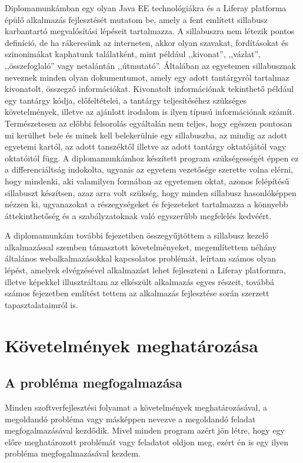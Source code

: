 \documentclass[hidelinks, 12pt, a4paper]{report}
\begin{document}
Diplomamunkámban egy olyan Java EE technológiákra \cite{java-se-platformon, java-ee-platformon} és a Liferay platforma épülő alkalmazás fejlesztését mutatom be, amely a fent említett sillabusz karbantartó megvalósítási lépéseit tartalmazza. A sillabuszra \cite{sillabusz} nem létezik pontos definíció, de ha rákeresünk az interneten, akkor olyan szavakat, fordításokat és szinonimákat kaphatunk találatként, mint például ,,kivonat'', ,,vázlat'', ,,összefoglaló'' vagy netalántán ,,útmutató''. Általában az egyetemen sillabusznak neveznek minden olyan dokumentumot, amely egy adott tantárgyról tartalmaz kivonatolt, összegző információkat. Kivonatolt információnak tekinthető például egy tantárgy kódja, előfeltételei, a tantárgy teljesítéséhez szükséges követelmények, illetve az ajánlott irodalom is ilyen típusú információnak számít. Természetesen az előbbi felsorolás egyáltalán nem teljes, hogy egészen pontosan mi kerülhet bele és minek kell belekerülnie egy sillabuszba, az mindig az adott egyetemi kartól, az adott tanszéktől illetve az adott tantárgy oktatójától vagy oktatóitól függ. A diplomamunkámhoz készített program szükségességét éppen ez a differenciáltság indokolta, ugyanis az egyetem vezetősége szerette volna elérni, hogy mindenki, aki valamilyen formában az egyetemen oktat, azonos felépítésű sillabuszt készítsen, azaz arra volt szükség, hogy minden sillabusz hasonlóképpen nézzen ki, ugyanazokat a részegységeket és fejezeteket tartalmazza a könnyebb áttekinthetőség és a szabályzatoknak való egyszerűbb megfelelés kedvéért.

A diplomamunkám további fejezetiben összegyűjtöttem a sillabusz kezelő alkalmazással szemben támasztott követelményeket, megemlítettem néhány általános webalkalmazásokkal kapcsolatos problémát, leírtam számos olyan lépést, amelyek elvégzésével alkalmazást lehet fejleszteni a Liferay platformra, illetve képekkel illusztráltam az elkészült alkalmazás egyes részeit, továbbá számos fejezetben említést tettem az alkalmazás fejlesztése során szerzett tapasztalataimról is.

\chapter{Követelmények meghatározása}

\section{A probléma megfogalmazása}

Minden szoftverfejlesztési folyamat a követelmények meghatározásával, a megoldandó probléma vagy másképpen nevezve a megoldandó feladat megfogalmazásával kezdődik. Mivel minden program azért jön létre, hogy egy előre meghatározott problémát vagy feladatot oldjon meg, ezért én is egy ilyen probléma megfogalmazásával kezdem.
\end{document}
